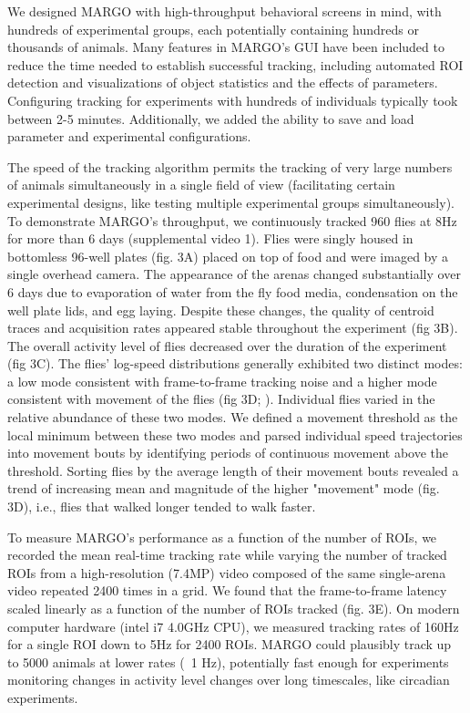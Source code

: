 \documentclass[10pt]{article}
\begin{document}
\begin{multicols}{2}
We designed MARGO with high-throughput behavioral screens in mind, with hundreds of experimental groups, each potentially containing hundreds or thousands of animals. Many features in MARGO's GUI have been included to reduce the time needed to establish successful tracking, including automated ROI detection and visualizations of object statistics and the effects of parameters. Configuring tracking for experiments with hundreds of individuals typically took between 2-5 minutes. Additionally, we added the ability to save and load parameter and experimental configurations.

The speed of the tracking algorithm permits the tracking of very large numbers of animals simultaneously in a single field of view (facilitating certain experimental designs, like testing multiple experimental groups simultaneously). To demonstrate MARGO's throughput, we continuously tracked 960 flies at 8Hz for more than 6 days (supplemental video 1). Flies were singly housed in bottomless 96-well plates (fig. 3A) placed on top of food and were imaged by a single overhead camera. The appearance of the arenas changed substantially over 6 days due to evaporation of water from the fly food media, condensation on the well plate lids, and egg laying. Despite these changes, the quality of centroid traces and acquisition rates appeared stable throughout the experiment (fig 3B). The overall activity level of flies decreased over the duration of the experiment (fig 3C). The flies' log-speed distributions generally exhibited two distinct modes: a low mode consistent with frame-to-frame tracking noise and a higher mode consistent with movement of the flies (fig 3D; \cite{berman_choi_bialek_shaevitz_2014}). Individual flies varied in the relative abundance of these two modes. We defined a movement threshold as the local minimum between these two modes and parsed individual speed trajectories into movement bouts by identifying periods of continuous movement above the threshold. Sorting flies by the average length of their movement bouts revealed a trend of increasing mean and magnitude of the higher "movement" mode (fig. 3D), i.e., flies that walked longer tended to walk faster.

To measure MARGO's performance as a function of the number of ROIs, we recorded the mean real-time tracking rate while varying the number of tracked ROIs from a high-resolution (7.4MP) video composed of the same single-arena video repeated 2400 times in a grid. We found that the frame-to-frame latency scaled linearly as a function of the number of ROIs tracked (fig. 3E). On modern computer hardware (intel i7 4.0GHz CPU), we measured tracking rates of 160Hz for a single ROI down to 5Hz for 2400 ROIs. MARGO could plausibly track up to 5000 animals at lower rates (~1 Hz), potentially fast enough for experiments monitoring changes in activity level changes over long timescales, like circadian experiments.


\end{multicols}
\end{document}
